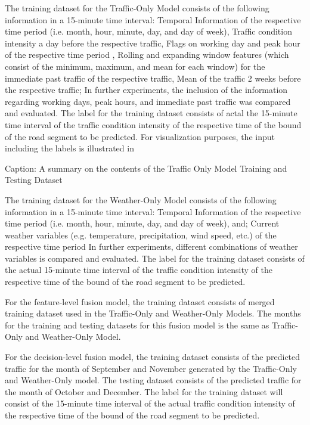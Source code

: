 The training dataset for the Traffic-Only Model consists of the following information in a 15-minute time interval: 
Temporal Information of the respective time period (i.e. month, hour, minute, day, and day of week),
Traffic condition intensity a day before the respective traffic,
Flags on working day and peak hour of the respective time period ,
Rolling and expanding window features (which consist of the minimum, maximum, and mean for each window) for the immediate past traffic of the respective traffic,
Mean of the traffic 2 weeks before the respective traffic;
In further experiments, the inclusion of the information regarding working days, peak hours, and immediate past traffic was compared and evaluated. The label for the training dataset consists of actal the 15-minute time interval of the traffic condition intensity of the respective time of the bound of the road segment to be predicted. For visualization purposes, the input including the labels is illustrated in 

Caption: A summary on the contents of the Traffic Only Model Training and Testing Dataset

The training dataset for the Weather-Only Model consists of the following information in a 15-minute time interval: 
Temporal Information of the respective time period (i.e. month, hour, minute, day, and day of week), and;
Current weather variables (e.g. temperature, precipitation, wind speed, etc.) of the respective time period
In further experiments, different combinations of weather variables is compared and evaluated. The label for the training dataset consists of the actual 15-minute time interval of the traffic condition intensity of the respective time of the bound of the road segment to be predicted. 

For the feature-level fusion model, the training dataset consists of merged training dataset used in the Traffic-Only and Weather-Only Models. The months for the training and testing datasets for this fusion model is the same as Traffic-Only and Weather-Only Model. 

For the decision-level fusion model, the training dataset consists of the predicted traffic for the month of September and November generated by the Traffic-Only and Weather-Only model. The testing dataset consists of the predicted traffic for the month of October and December. The label for the training dataset will consist of the 15-minute time interval of the actual traffic condition intensity of the respective time of the bound of the road segment to be predicted. 


